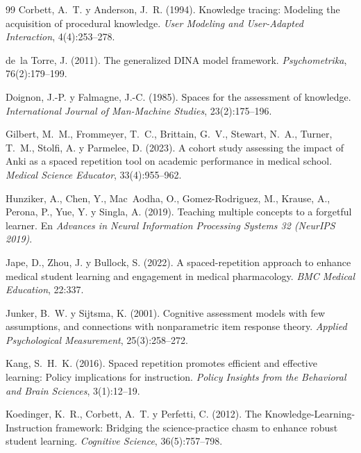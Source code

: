 \documentclass[12pt]{article}
\theoremstyle{definition}
\begin{document}
\begin{thebibliography}{99}
Corbett, A.~T. y Anderson, J.~R. (1994).
\newblock Knowledge tracing: Modeling the acquisition of procedural knowledge.
\newblock \emph{User Modeling and User-Adapted Interaction}, 4(4):253--278.

de~la Torre, J. (2011).
\newblock The generalized DINA model framework.
\newblock \emph{Psychometrika}, 76(2):179--199.

Doignon, J.-P. y Falmagne, J.-C. (1985).
\newblock Spaces for the assessment of knowledge.
\newblock \emph{International Journal of Man-Machine Studies}, 23(2):175--196.

Gilbert, M.~M., Frommeyer, T.~C., Brittain, G.~V., Stewart, N.~A., Turner, T.~M., Stolfi, A. y Parmelee, D. (2023).
\newblock A cohort study assessing the impact of Anki as a spaced repetition tool on academic performance in medical school.
\newblock \emph{Medical Science Educator}, 33(4):955--962.

Hunziker, A., Chen, Y., Mac~Aodha, O., Gomez-Rodriguez, M., Krause, A., Perona, P., Yue, Y. y Singla, A. (2019).
\newblock Teaching multiple concepts to a forgetful learner.
\newblock En \emph{Advances in Neural Information Processing Systems 32 (NeurIPS 2019)}.

Jape, D., Zhou, J. y Bullock, S. (2022).
\newblock A spaced-repetition approach to enhance medical student learning and engagement in medical pharmacology.
\newblock \emph{BMC Medical Education}, 22:337.

Junker, B.~W. y Sijtsma, K. (2001).
\newblock Cognitive assessment models with few assumptions, and connections with nonparametric item response theory.
\newblock \emph{Applied Psychological Measurement}, 25(3):258--272.

Kang, S.~H.~K. (2016).
\newblock Spaced repetition promotes efficient and effective learning: Policy implications for instruction.
\newblock \emph{Policy Insights from the Behavioral and Brain Sciences}, 3(1):12--19.

Koedinger, K.~R., Corbett, A.~T. y Perfetti, C. (2012).
\newblock The Knowledge-Learning-Instruction framework: Bridging the science-practice chasm to enhance robust student learning.
\newblock \emph{Cognitive Science}, 36(5):757--798.


\end{thebibliography}
\end{document}
